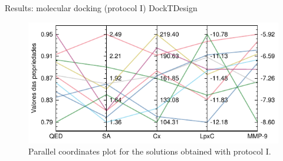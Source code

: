 \documentclass[aspectratio=169,xcolor=dvipsnames]{beamer}
\begin{document}
\begin{frame}{Results: molecular docking (protocol I) \hfill {\footnotesize \alert{DockTDesign}}}
    \begin{figure}
        \centering
        \includegraphics[width=.8\textwidth]{imgs/results/protocol1-parallel-coords}
        \caption{Parallel coordinates plot for the solutions obtained with protocol I.}
    \end{figure}
\end{frame}





\end{document}
